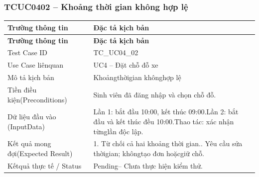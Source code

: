 \subsubsection{TCUC0402 – Khoảng thời gian không hợp lệ}
\begin{longtable}{|L{0.24\textwidth}|L{0.70\textwidth}|}
\hline
\textbf{Trường thông tin} & \textbf{Đặc tả kịch bản} \\
\hline
\endfirsthead
\hline
\textbf{Trường thông tin} & \textbf{Đặc tả kịch bản} \\
\hline
\endhead
Test Case ID & TC\_UC04\_02 \\
\hline
Use Case liênquan & UC4 – Đặt chỗ đỗ xe \\
\hline
Mô tả kịch bản & Khoảngthờigian khônghợp lệ \\
\hline
Tiền điều kiện\newline (Preconditions) & Sinh viên đã đăng nhập và chọn chỗ đỗ. \\
\hline
Dữ liệu đầu vào (Input\newline Data) & Lần 1: bắt đầu 10:00, kết thúc 09:00.\newline Lần 2: bắt đầu và kết thúc đều 10:00.\newline Thao tác: xác nhận từnglần độc lập. \\
\hline
Kết quả mong đợi\newline (Expected Result) & 1. Từ chối cả hai khoảng thời gian.. Yêu cầu sửa thờigian; khôngtạo đơn hoặcgiữ chỗ. \\
\hline
Kếtquả thực tế / Status & Pending– Chưa thực hiện kiểm thử. \\
\hline
\end{longtable}
\vspace{-0.5\baselineskip}
